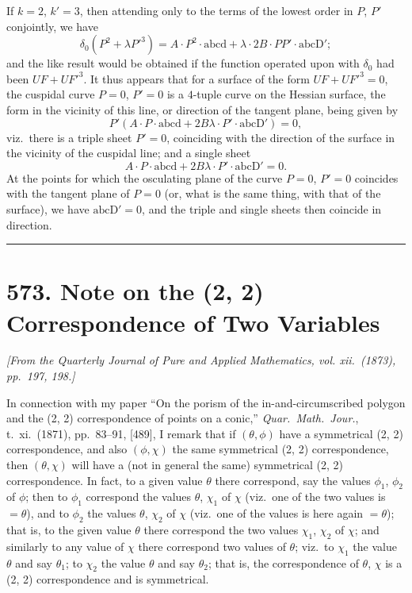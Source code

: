 \documentclass[11pt]{article}
\begin{document}
If $k=2$, $k'=3$, then attending only to the terms of the lowest order in $P$, $P'$ conjointly, we have
\[
\delta_{0}(P^{2}+\lambda P'^{3}) = A \cdot P^{2} \cdot \mathrm{abcd}
+ \lambda \cdot 2B \cdot PP' \cdot \mathrm{abcD'};
\]
and the like result would be obtained if the function operated upon with $\delta_{0}$ had been $UF+UF'^{3}$. It thus appears that for a surface of the form $UF+UF'^{3}=0$, the cuspidal curve $P=0$, $P'=0$ is a $4$-tuple curve on the Hessian surface, the form in the vicinity of this line, or direction of the tangent plane, being given by
\[
P'(A \cdot P \cdot \mathrm{abcd} + 2B\lambda \cdot P' \cdot \mathrm{abcD'}) = 0,
\]
viz.\ there is a triple sheet $P'=0$, coinciding with the direction of the surface in the vicinity of the cuspidal line; and a single sheet
\[
A \cdot P \cdot \mathrm{abcd} + 2B\lambda \cdot P' \cdot \mathrm{abcD'} = 0.
\]
At the points for which the osculating plane of the curve $P=0$, $P'=0$ coincides with the tangent plane of $P=0$ (or, what is the same thing, with that of the surface), we have $\mathrm{abcD'}=0$, and the triple and single sheets then coincide in direction.

\bigskip
\hrule
\bigskip

\section*{573. Note on the (2, 2) Correspondence of Two Variables}

\noindent\textit{[From the Quarterly Journal of Pure and Applied Mathematics, vol. xii.\ (1873), pp.\ 197, 198.]}

\medskip

In connection with my paper ``On the porism of the in-and-circumscribed polygon and the (2, 2) correspondence of points on a conic,'' \textit{Quar.\ Math.\ Jour.}, t.\ xi.\ (1871), pp.\ 83--91, [489], I remark that if $(\theta,\phi)$ have a symmetrical (2, 2) correspondence, and also $(\phi,\chi)$ the same symmetrical (2, 2) correspondence, then $(\theta,\chi)$ will have a (not in general the same) symmetrical (2, 2) correspondence. In fact, to a given value $\theta$ there correspond, say the values $\phi_{1}$, $\phi_{2}$ of $\phi$; then to $\phi_{1}$ correspond the values $\theta$, $\chi_{1}$ of $\chi$ (viz.\ one of the two values is $=\theta$), and to $\phi_{2}$ the values $\theta$, $\chi_{2}$ of $\chi$ (viz.\ one of the values is here again $=\theta$); that is, to the given value $\theta$ there correspond the two values $\chi_{1}$, $\chi_{2}$ of $\chi$; and similarly to any value of $\chi$ there correspond two values of $\theta$; viz.\ to $\chi_{1}$ the value $\theta$ and say $\theta_{1}$; to $\chi_{2}$ the value $\theta$ and say $\theta_{2}$; that is, the correspondence of $\theta$, $\chi$ is a (2, 2) correspondence and is symmetrical.
\end{document}
